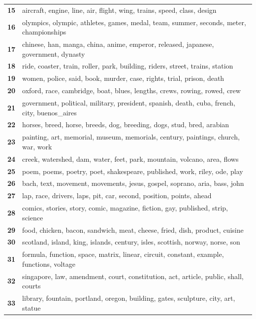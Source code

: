 \begin{table}[htpb]
\begin{tabularx}{\textwidth}{@{}l X@{}}
        \textbf{15} & aircraft, engine, line, air, flight, wing, trains, speed, class, design \\
        \textbf{16} & olympics, olympic, athletes, games, medal, team, summer, seconds, meter, championships \\
        \textbf{17} & chinese, han, manga, china, anime, emperor, released, japanese, government, dynasty \\
        \textbf{18} & ride, coaster, train, roller, park, building, riders, street, trains, station \\
        \textbf{19} & women, police, said, book, murder, case, rights, trial, prison, death \\
        \textbf{20} & oxford, race, cambridge, boat, blues, lengths, crews, rowing, rowed, crew \\
        \textbf{21} & government, political, military, president, spanish, death, cuba, french, city, buenos\_aires \\
        \textbf{22} & horses, breed, horse, breeds, dog, breeding, dogs, stud, bred, arabian \\
        \textbf{23} & painting, art, memorial, museum, memorials, century, paintings, church, war, work \\
        \textbf{24} & creek, watershed, dam, water, feet, park, mountain, volcano, area, flows \\
        \textbf{25} & poem, poems, poetry, poet, shakespeare, published, work, riley, ode, play \\
        \textbf{26} & bach, text, movement, movements, jesus, gospel, soprano, aria, bass, john \\
        \textbf{27} & lap, race, drivers, laps, pit, car, second, position, points, ahead \\
        \textbf{28} & comics, stories, story, comic, magazine, fiction, gay, published, strip, science \\
        \textbf{29} & food, chicken, bacon, sandwich, meat, cheese, fried, dish, product, cuisine \\
        \textbf{30} & scotland, island, king, islands, century, isles, scottish, norway, norse, son \\
        \textbf{31} & formula, function, space, matrix, linear, circuit, constant, example, functions, voltage \\
        \textbf{32} & singapore, law, amendment, court, constitution, act, article, public, shall, courts \\
        \textbf{33} & library, fountain, portland, oregon, building, gates, sculpture, city, art, statue \\

\end{tabularx}
\end{table}
